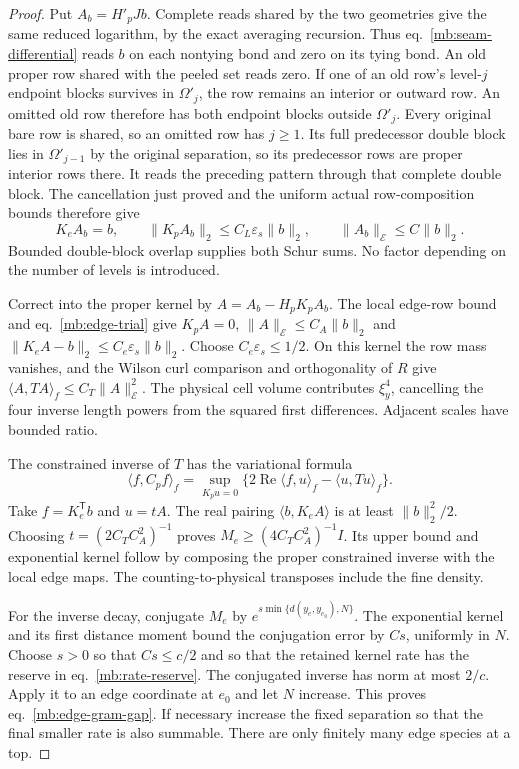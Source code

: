 \documentclass[11pt,letterpaper,reqno]{amsart}
\numberwithin{equation}{section}
\renewcommand{\eqref}[1]{\textup{eq.~\ref{#1}}}
\theoremstyle{definition}
\theoremstyle{remark}
\begin{document}
\begin{proof}
Put $A_b=H'_pJb$. Complete reads shared by the two geometries
give the same reduced logarithm, by the exact averaging
recursion. Thus \eqref{mb:seam-differential} reads $b$ on each
nontying bond and zero on its tying bond. An old proper row
shared with the peeled set reads zero. If one of an old
row's level-$j$ endpoint blocks survives in $\Omega'_j$,
the row remains an interior or outward row. An omitted old
row therefore has both endpoint blocks outside $\Omega'_j$.
Every original bare row is shared, so an omitted row has
$j\ge1$. Its full predecessor double block lies in
$\Omega'_{j-1}$ by the
original separation, so its predecessor rows are proper
interior rows there. It reads the preceding pattern through
that complete double block. The cancellation just proved and the uniform
actual row-composition bounds therefore give
\begin{equation}\label{mb:edge-trial}
 K_eA_b=b,\qquad
 \|K_pA_b\|_2\le C_L\varepsilon_s\|b\|_2,\qquad
 \|A_b\|_{\mathcal E}\le C\|b\|_2.
\end{equation}
Bounded double-block overlap supplies both Schur sums. No
factor depending on the number of levels is introduced.

Correct into the proper kernel by
$A=A_b-H_pK_pA_b$. The local edge-row bound and
\eqref{mb:edge-trial} give
$K_pA=0$, $\|A\|_{\mathcal E}\le C_A\|b\|_2$ and
$\|K_eA-b\|_2\le C_e\varepsilon_s\|b\|_2$.
Choose $C_e\varepsilon_s\le1/2$. On this kernel the row mass vanishes,
and the Wilson curl comparison and orthogonality of $R$ give
$\langle A,TA\rangle_f\le C_T\|A\|_{\mathcal E}^2$.
The physical cell volume contributes $\xi_y^4$, cancelling
the four inverse length powers from the squared first
differences. Adjacent scales have bounded ratio.

The constrained inverse of $T$ has the variational formula
\[
 \langle f,C_pf\rangle_f
   =\sup_{K_pu=0}\{2\operatorname{Re}\langle f,u\rangle_f
                                      -\langle u,Tu\rangle_f\}.
\]
Take $f=K_e^{\mathsf T}b$ and $u=tA$. The real pairing
$\langle b,K_eA\rangle$ is at least $\|b\|_2^2/2$.
Choosing $t=(2C_TC_A^2)^{-1}$ proves
$M_e\ge(4C_TC_A^2)^{-1}I$.
Its upper bound and exponential kernel follow by composing
the proper constrained inverse with the local edge maps.
The counting-to-physical transposes include the fine density.

For the inverse decay, conjugate $M_e$ by
$e^{s\min\{d(y_e,y_{e_0}),N\}}$.
The exponential kernel and its first distance moment bound
the conjugation error by $Cs$, uniformly in $N$.
Choose $s>0$ so that $Cs\le c/2$ and so that the retained
kernel rate has the reserve in \eqref{mb:rate-reserve}.
The conjugated inverse has norm at most $2/c$.
Apply it to an edge coordinate at $e_0$ and let $N$ increase.
This proves \eqref{mb:edge-gram-gap}. If necessary increase
the fixed separation so that the final smaller rate is also
summable. There are only finitely many edge species at a top.


\end{proof}
\end{document}
